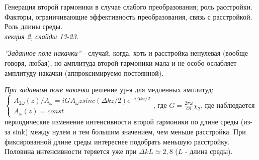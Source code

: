
\begin{leftrules}
Генерация второй гармоники в случае слабого преобразования; роль расстройки. Факторы, ограничивающие эффективность преобразования, связь с расстройкой. Роль длины среды. 
\\ \phantom{42} \hfill \textit{лекция 2, слайды 13-23.} 
\end{leftrules}


\begin{to_def}
    \textit{''Заданное поле накачки''} - случай, когда, хоть и расстройка ненулевая (вообще говоря, любая), но амплитуда второй гармоники мала и не особо ослабляет амплитуду накачки (аппроксимируемо постоянной).
\end{to_def}

\textit{При заданном поле накачки} решение ур-я для медленных амплитуд: \\$
    \begin{cases}
        A_{2\omega}(z)/A_{\omega}=iGA_{\omega}z sinc(\Delta k z/2) e^{-i\Delta k z/2} \\
        A_{\omega}(z)=const
    \end{cases}$, где $G=\frac{2\pi \omega}{cn}\chi_{2}$, где наблюдается периодические изменение интенсивности второй гармоники по длине среды (из-за sink) между нулем и тем большим значением, чем меньше расстройка. При фиксированной длине среды интереснее подобрать меньшую расстройку. Половина интенсивности теряется уже при $\Delta k L \simeq 2,8$ ($L$ - длина среды).


